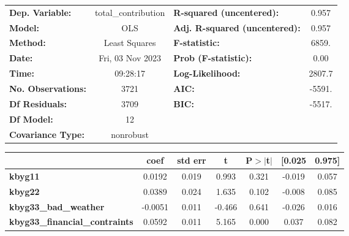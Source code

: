 \begin{center}
\begin{tabular}{lclc}
\toprule
\textbf{Dep. Variable:}                      & total\_contribution & \textbf{  R-squared (uncentered):}      &     0.957   \\
\textbf{Model:}                              &         OLS         & \textbf{  Adj. R-squared (uncentered):} &     0.957   \\
\textbf{Method:}                             &    Least Squares    & \textbf{  F-statistic:       }          &     6859.   \\
\textbf{Date:}                               &   Fri, 03 Nov 2023  & \textbf{  Prob (F-statistic):}          &     0.00    \\
\textbf{Time:}                               &       09:28:17      & \textbf{  Log-Likelihood:    }          &    2807.7   \\
\textbf{No. Observations:}                   &          3721       & \textbf{  AIC:               }          &    -5591.   \\
\textbf{Df Residuals:}                       &          3709       & \textbf{  BIC:               }          &    -5517.   \\
\textbf{Df Model:}                           &            12       & \textbf{                     }          &             \\
\textbf{Covariance Type:}                    &      nonrobust      & \textbf{                     }          &             \\
\bottomrule
\end{tabular}
\begin{tabular}{lcccccc}
                                             & \textbf{coef} & \textbf{std err} & \textbf{t} & \textbf{P$> |$t$|$} & \textbf{[0.025} & \textbf{0.975]}  \\
\midrule
\textbf{kbyg11}                              &       0.0192  &        0.019     &     0.993  &         0.321        &       -0.019    &        0.057     \\
\textbf{kbyg22}                              &       0.0389  &        0.024     &     1.635  &         0.102        &       -0.008    &        0.085     \\
\textbf{kbyg33\_bad\_weather}                &      -0.0051  &        0.011     &    -0.466  &         0.641        &       -0.026    &        0.016     \\
\textbf{kbyg33\_financial\_contraints}       &       0.0592  &        0.011     &     5.165  &         0.000        &        0.037    &        0.082     \\

\end{tabular}
\end{center}
